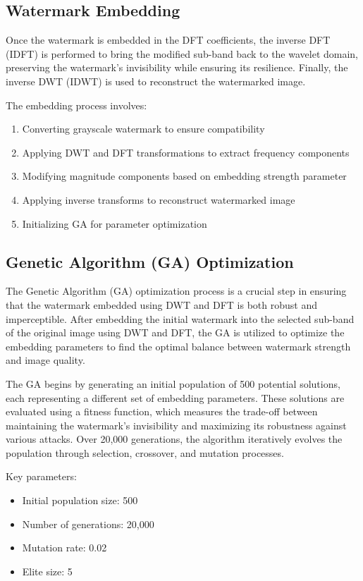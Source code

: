 \subsection{Watermark Embedding}

Once the watermark is embedded in the DFT coefficients, the inverse DFT (IDFT) is performed to bring the modified sub-band back to the wavelet domain, preserving the watermark's invisibility while ensuring its resilience. Finally, the inverse DWT (IDWT) is used to reconstruct the watermarked image.

The embedding process involves:
\begin{enumerate}
    \item Converting grayscale watermark to ensure compatibility
    \item Applying DWT and DFT transformations to extract frequency components
    \item Modifying magnitude components based on embedding strength parameter
    \item Applying inverse transforms to reconstruct watermarked image
    \item Initializing GA for parameter optimization
\end{enumerate}

\subsection{Genetic Algorithm (GA) Optimization}

The Genetic Algorithm (GA) optimization process is a crucial step in ensuring that the watermark embedded using DWT and DFT is both robust and imperceptible. After embedding the initial watermark into the selected sub-band of the original image using DWT and DFT, the GA is utilized to optimize the embedding parameters to find the optimal balance between watermark strength and image quality.

The GA begins by generating an initial population of 500 potential solutions, each representing a different set of embedding parameters. These solutions are evaluated using a fitness function, which measures the trade-off between maintaining the watermark's invisibility and maximizing its robustness against various attacks. Over 20,000 generations, the algorithm iteratively evolves the population through selection, crossover, and mutation processes. 

Key parameters:
\begin{itemize}
    \item Initial population size: 500
    \item Number of generations: 20,000
    \item Mutation rate: 0.02
    \item Elite size: 5
\end{itemize}

